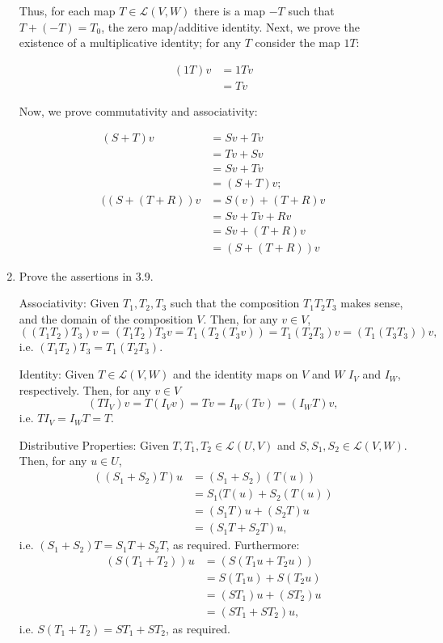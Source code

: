 \documentclass{book}
\begin{document}
\begin{enumerate}
Thus, for each map \(T \in \mathcal{L}(V,W)\) there is a map \(-T\) such that \(T+(-T)=T_0\), the zero map/additive identity.  Next, we prove the existence of a multiplicative identity; for any \(T\) consider the map \(1T\):

\begin{equation*}
    \begin{split}
        (1T)v &= 1Tv \\
        &= Tv
    \end{split}
\end{equation*}

Now, we prove commutativity and associativity:

\begin{equation*}
    \begin{split}
        (S+T)v &= Sv+Tv \\
        &= Tv+Sv \\
        &= Sv+Tv \\
        &= (S+T)v; \\
        ((S+(T+R))v &= S(v)+(T+R)v \\
        &= Sv+Tv+Rv \\
        &= Sv+(T+R)v \\
        &= (S+(T+R))v
    \end{split}
\end{equation*}

\item Prove the assertions in 3.9.

Associativity: Given \(T_1,T_2,T_3\) such that the composition \(T_1T_2T_3\) makes sense, and the domain of the composition \(V\).  Then, for any \(v \in V\), \[((T_1T_2)T_3)v=(T_1T_2)T_3v=T_1(T_2(T_3v))=T_1(T_2T_3)v=(T_1(T_3T_3))v,\] i.e. \((T_1T_2)T_3=T_1(T_2T_3)\).

Identity: Given \(T \in \mathcal{L}(V,W)\) and the identity maps on \(V\) and \(W\) \(I_V\) and \(I_W\), respectively.  Then, for any \(v \in V\) \[(TI_V)v=T(I_Vv)=Tv=I_W(Tv)=(I_WT)v,\] i.e. \(TI_V=I_WT=T\).

Distributive Properties: Given \(T,T_1,T_2 \in \mathcal{L}(U,V)\) and \(S,S_1,S_2 \in \mathcal{L}(V,W)\).  Then, for any \(u \in U\),
\begin{align*}
((S_1+S_2)T)u &= (S_1+S_2)(T(u))\\
&= S_1(T(u)+S_2(T(u)) \\
&= (S_1T)u+(S_2T)u \\
&= (S_1T+S_2T)u,
\end{align*}
i.e. \((S_1+S_2)T=S_1T+S_2T\), as required.  Furthermore:
\begin{align*}
(S(T_1+T_2))u &= (S(T_1u+T_2u))\\
&= S(T_1u)+S(T_2u) \\
&= (ST_1)u+(ST_2)u \\
&= (ST_1+ST_2)u,
\end{align*}
i.e. \(S(T_1+T_2)=ST_1+ST_2\), as required.


\end{enumerate}
\end{document}

